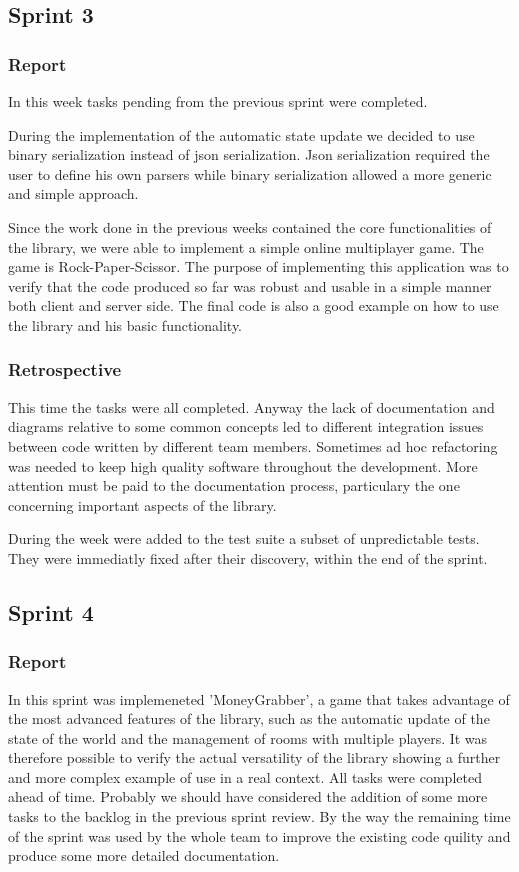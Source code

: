 \subsection{Sprint 3}
\subsubsection{Report}

In this week tasks pending from the previous sprint were completed.

During the implementation of the automatic state update we decided to use binary serialization instead of json serialization. Json serialization required the user to define his own parsers while binary serialization allowed a more generic and simple approach.

Since the work done in the previous weeks contained the core functionalities of the library, we were able to implement a simple online multiplayer game.
The game is Rock-Paper-Scissor. 
The purpose of implementing this application was to verify that the code produced so far was robust and usable in a simple manner both client and server side.
The final code is also a good example on how to use the library and his basic functionality.


\subsubsection{Retrospective}
This time the tasks were all completed. 
Anyway the lack of documentation and diagrams relative to some common concepts led to different integration issues  between code written by different team members. Sometimes ad hoc refactoring was needed to keep high quality software throughout the development.
More attention must be paid to the documentation process, particulary the one concerning important aspects of the library. 

During the week were added to the test suite a subset of unpredictable tests.
They were immediatly fixed after their discovery, within the end of the sprint.




\subsection{Sprint 4}
\subsubsection{Report}
In this sprint was implemeneted 'MoneyGrabber', a game that takes advantage of the most advanced features of the library, such as the automatic update of the state of the world and the management of rooms with multiple players.
It was therefore possible to verify the actual versatility of the library showing a further and more complex example of use in a real context.
All tasks were completed ahead of time.
Probably we should have considered the addition of some more tasks to the backlog in the previous sprint review. By the way the remaining time of the sprint was used by the whole team to improve the existing code quility and produce some more detailed documentation.



